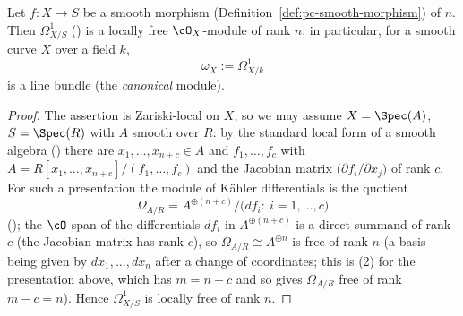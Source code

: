 \begin{lemma}
\label{lem:pc-omega-line-bundle}
Let $f:X\to S$ be a smooth morphism
(Definition~\ref{def:pc-smooth-morphism}) of
 $n$.
Then $\Omega^1_{X/S}$
() is a locally free $\cO_X$-module
of rank $n$; in particular, for a smooth curve $X$ over a field $k$,
\[
\omega_X:=\Omega^1_{X/k}
\]
is a line bundle (the \emph{canonical} module).
\end{lemma}
\begin{proof}
The assertion is Zariski-local on $X$, so we may assume
$X=\Spec(A)$, $S=\Spec(R)$ with $A$ smooth over $R$: by the standard
local form of a smooth algebra () there are
$x_1,\dots,x_{n+c}\in A$ and $f_1,\dots,f_c$ with
$A=R[x_1,\dots,x_{n+c}]/(f_1,\dots,f_c)$ and the Jacobian matrix
$\bigl(\partial f_i/\partial x_j\bigr)$ of rank $c$.  For such a
presentation the module of Kähler differentials is the quotient
\[
\Omega_{A/R}=A^{\oplus(n+c)}\Big/\bigl(df_i:\ i=1,\dots,c\bigr)
\]
(); the
$\cO$-span of the differentials $df_i$ in $A^{\oplus(n+c)}$ is a
direct summand of rank $c$ (the Jacobian matrix has rank $c$), so
$\Omega_{A/R}\cong A^{\oplus n}$ is free of rank $n$ (a basis being
given by $dx_1,\dots,dx_n$ after a change of coordinates; this is
(2) for the presentation
above, which has $m=n+c$ and so gives $\Omega_{A/R}$ free of rank
$m-c=n$).  Hence
$\Omega^1_{X/S}$ is locally free of rank $n$.
\end{proof}

